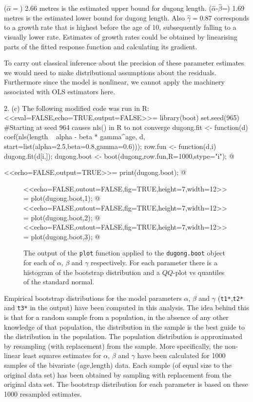 ($\hat\alpha=$) 2.66 metres is the estimated upper bound for dugong
length. ($\hat\alpha$-$\hat\beta$=) 1.69 metres is the estimated
lower bound for dugong length. Also $\hat\gamma=$0.87 corresponds to a
growth rate that is highest before the age of 10, subsequently falling to a
visually lower rate. Estimates of growth rates could be obtained by
linearising parts of the fitted response function and calculating its
gradient.

To carry out classical inference about the precision of these parameter
estimates we would need to make distributional assumptions about the
residuals. Furthermore since the model is nonlinear, we cannot apply
the machinery associated with OLS estimators here.

2. (c) The following modified code was run in R:
<<eval=FALSE,echo=TRUE,output=FALSE>>=
library(boot)
set.seed(965) #Starting at seed 964 causes nls() in R to not converge
dugong.fit <- function(d) {
    coef(nls(length ~ alpha - beta * gamma^age, d,
          start=list(alpha=2.5,beta=0.8,gamma=0.6)));
}
row.fun <- function(d,i) {
 dugong.fit(d[i,]);
}
dugong.boot <- boot(dugong,row.fun,R=1000,stype="i");
@

<<echo=FALSE,output=TRUE>>=
print(dugong.boot);
@

\begin{figure}[h]
  \begin{center}
<<echo=FALSE,outout=FALSE,fig=TRUE,height=7,width=12>>=
plot(dugong.boot,1);
@
<<echo=FALSE,outout=FALSE,fig=TRUE,height=7,width=12>>=
plot(dugong.boot,2);
@
<<echo=FALSE,outout=FALSE,fig=TRUE,height=7,width=12>>=
plot(dugong.boot,3);
@
\caption{The output of the \texttt{plot} function applied to the
  \texttt{dugong.boot} object for each of $\alpha$, $\beta$ and
  $\gamma$ respectively. For each parameter there is a histogram
  of the bootstrap distribution and a $QQ$-plot vs quantiles of the
  standard normal.}
\label{fig:plotboot}
\end{center}
\end{figure}

Empirical bootstrap distributions for the model parameters $\alpha$, $\beta$ and
$\gamma$ (\texttt{t1*},\texttt{t2*} and \texttt{t3*} in the output)
have been computed in this analysis. The idea behind this is
that for a random sample from a population, in the absence of any
other knowledge of that population, the distribution in the sample is
the best guide to the distribution in the population. The population
distribution is approximated by resampling (with replacement) from the
sample. More specifically, the non-linear least squares estimates for
$\alpha$, $\beta$ and $\gamma$ have been calculated for 1000 samples
of the bivariate (age,length) data. Each sample (of equal size to the
original data set) has been obtained by sampling with replacement from
the original data set. The bootstrap distribution for each parameter
is based on these 1000 resampled estimates.

